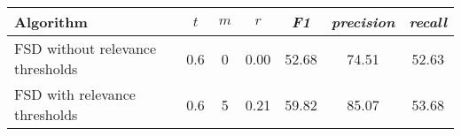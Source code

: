 \begin{tabular}{|l|cccccc|}
\hline
               \textbf{Algorithm} &  $t$ &  $m$ &   $r$ &  \textit{F1} &  \textit{precision} &  \textit{recall} \\
\hline
 FSD without relevance thresholds &  0.6 &    0 &  0.00 &        52.68 &               74.51 &            52.63 \\
    FSD with relevance thresholds &  0.6 &    5 &  0.21 &        59.82 &               85.07 &            53.68 \\
\hline
\end{tabular}
